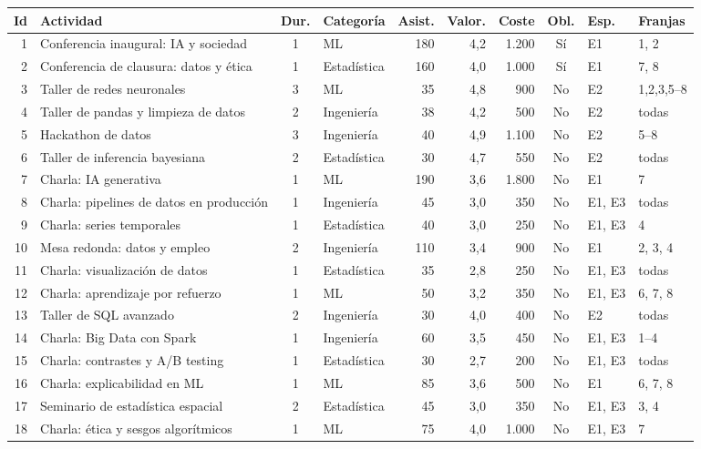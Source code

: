 {\footnotesize
\begin{longtable}{@{}r p{4.6cm} c l r r r c l l@{}}
\toprule
Id & Actividad & Dur. & Categor\'ia & Asist. & Valor. & Coste & Obl. & Esp. & Franjas\\\midrule\endhead
1 & Conferencia inaugural: IA y sociedad & 1 & ML & 180 & 4,2 & 1.200 & S\'i & E1 & 1, 2\\
2 & Conferencia de clausura: datos y \'etica & 1 & Estad\'istica & 160 & 4,0 & 1.000 & S\'i & E1 & 7, 8\\
3 & Taller de redes neuronales & 3 & ML & 35 & 4,8 & 900 & No & E2 & 1,2,3,5--8\\
4 & Taller de pandas y limpieza de datos & 2 & Ingenier\'ia & 38 & 4,2 & 500 & No & E2 & todas\\
5 & Hackathon de datos & 3 & Ingenier\'ia & 40 & 4,9 & 1.100 & No & E2 & 5--8\\
6 & Taller de inferencia bayesiana & 2 & Estad\'istica & 30 & 4,7 & 550 & No & E2 & todas\\
7 & Charla: IA generativa & 1 & ML & 190 & 3,6 & 1.800 & No & E1 & 7\\
8 & Charla: pipelines de datos en producci\'on & 1 & Ingenier\'ia & 45 & 3,0 & 350 & No & E1, E3 & todas\\
9 & Charla: series temporales & 1 & Estad\'istica & 40 & 3,0 & 250 & No & E1, E3 & 4\\
10 & Mesa redonda: datos y empleo & 2 & Ingenier\'ia & 110 & 3,4 & 900 & No & E1 & 2, 3, 4\\
11 & Charla: visualizaci\'on de datos & 1 & Estad\'istica & 35 & 2,8 & 250 & No & E1, E3 & todas\\
12 & Charla: aprendizaje por refuerzo & 1 & ML & 50 & 3,2 & 350 & No & E1, E3 & 6, 7, 8\\
13 & Taller de SQL avanzado & 2 & Ingenier\'ia & 30 & 4,0 & 400 & No & E2 & todas\\
14 & Charla: Big Data con Spark & 1 & Ingenier\'ia & 60 & 3,5 & 450 & No & E1, E3 & 1--4\\
15 & Charla: contrastes y A/B testing & 1 & Estad\'istica & 30 & 2,7 & 200 & No & E1, E3 & todas\\
16 & Charla: explicabilidad en ML & 1 & ML & 85 & 3,6 & 500 & No & E1 & 6, 7, 8\\
17 & Seminario de estad\'istica espacial & 2 & Estad\'istica & 45 & 3,0 & 350 & No & E1, E3 & 3, 4\\
18 & Charla: \'etica y sesgos algor\'itmicos & 1 & ML & 75 & 4,0 & 1.000 & No & E1, E3 & 7\\\bottomrule
\end{longtable}}

